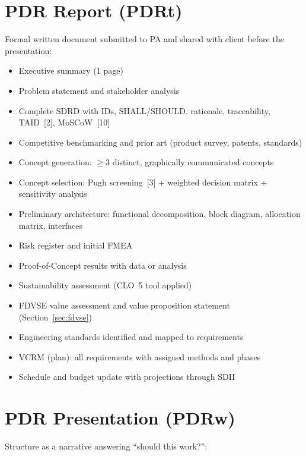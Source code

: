 \section{PDR Report (PDRt)}
Formal written document submitted to PA and shared with client before the presentation:
\begin{itemize}[nosep,leftmargin=1.5em]
\item Executive summary (1 page)
\item Problem statement and stakeholder analysis
\item Complete SDRD with IDs, SHALL/SHOULD, rationale, traceability, TAID~[2], MoSCoW~[10]
\item Competitive benchmarking and prior art (product survey, patents, standards)
\item Concept generation: $\geq$3 distinct, graphically communicated concepts
\item Concept selection: Pugh screening~[3] + weighted decision matrix + sensitivity analysis
\item Preliminary architecture: functional decomposition, block diagram, allocation matrix, interfaces
\item Risk register and initial FMEA
\item Proof-of-Concept results with data or analysis
\item Sustainability assessment (CLO~5 tool applied)
\item FDVSE value assessment and value proposition statement (Section~\ref{sec:fdvse})
\item Engineering standards identified and mapped to requirements
\item VCRM (plan): all requirements with assigned methods and phases
\item Schedule and budget update with projections through SDII
\end{itemize}

\section{PDR Presentation (PDRw)}
Structure as a narrative answering ``should this work?'':

